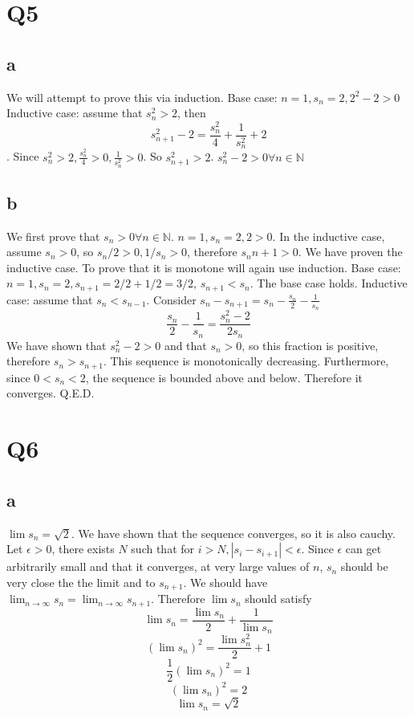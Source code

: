 \documentclass[12pt]{article}
\newcommand{\N}{\mathbb{N}}
\begin{document}
\section{Q5}
\subsection{a}
We will attempt to prove this via induction.
\newline
Base case: $n = 1, s_n = 2, 2^2-2 >0$
\newline
Inductive case: assume that $s_n^2>2$, then $$s_{n+1}^2-2 = \frac{s_n^2}{4} + \frac{1}{s_n^2} + 2$$. Since $s_n^2 > 2, \frac{s_n^2}{4}>0, \frac{1}{s_n^2}>0$. So $s_{n+1}^2 > 2$.
\newline
$s_n^2 -2> 0 \forall n \in \N$

\subsection{b}
We first prove that $s_n > 0 \forall n \in \N$. $n = 1, s_n = 2, 2>0$.
\newline
In the inductive case, assume $s_n > 0$, so $s_n/2 > 0, 1/s_n>0$, therefore $s_n{n+1}>0$. We have proven the inductive case.
\newline
To prove that it is monotone will again use induction.
\newline
Base case: $n = 1, s_n = 2, s_{n+1} = 2/2 + 1/2 = 3/2$, $s_{n+1}<s_n$. The base case holds.
\newline
Inductive case: assume that $s_n < s_{n-1}$. Consider $s_n-s_{n+1} = s_n - \frac{s_n}{2} - \frac{1}{s_n}$
$$\frac{s_n}{2} - \frac{1}{s_n} = \frac{s_n^2-2}{2s_n}$$
We have shown that $s_n^2 -2> 0 $ and that $s_n>0$, so this fraction is positive, therefore $s_n > s_{n+1}$. This sequence is monotonically decreasing.
\newline
Furthermore, since $0<s_n<2$, the sequence is bounded above and below. Therefore it converges. Q.E.D.
\newpage


\section{Q6}
\subsection{a}
$\lim s_n = \sqrt2$.
\newline
We have shown that the sequence converges, so it is also cauchy. Let $\epsilon > 0$, there exists $N$ such that for $ i> N, |s_i - s_{i+1}| < \epsilon$.
\newline
Since $\epsilon$ can get arbitrarily small and that it converges, at very large values of $n$, $s_n$ should be very close the the limit and to $s_{n+1}$. We should have $\lim_{n \to \infty} s_n= \lim_{n \to \infty} s_{n+1}$. Therefore $\lim s_n$ should satisfy $$\lim s_n = \frac{\lim s_n}{2}+ \frac{1}{\lim s_n}$$
$$(\lim s_n)^2 = \frac{\lim s_n^2}{2} + 1$$
$$\frac{1}{2}(\lim s_n)^2 = 1$$
$$(\lim s_n)^2 = 2$$
$$\lim s_n= \sqrt2$$
\end{document}
